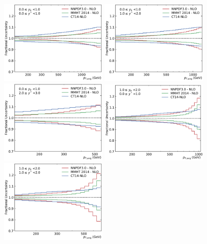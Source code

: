 \begin{figure}[htp]
    \centering
    \includegraphics[width=0.47\textwidth]{figures/theory/pdf_unc_comparison_yb0ys0.pdf}\hfill
    \includegraphics[width=0.47\textwidth]{figures/theory/pdf_unc_comparison_yb0ys1.pdf}
    \includegraphics[width=0.47\textwidth]{figures/theory/pdf_unc_comparison_yb0ys2.pdf}\hfill
    \includegraphics[width=0.47\textwidth]{figures/theory/pdf_unc_comparison_yb1ys0.pdf}
    \includegraphics[width=0.47\textwidth]{figures/theory/pdf_unc_comparison_yb1ys1.pdf}\hfill

\end{figure}
